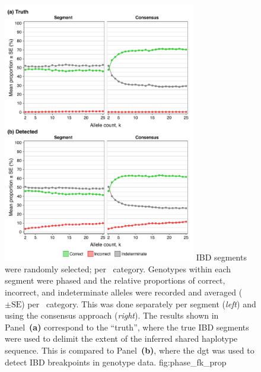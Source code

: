 

\begin{figure}[!htb]
\centering
\includegraphics[width=0.75\textwidth]{./img/ch3/phase_fk_prop}
{IBD segments were randomly selected;  per \fk{}~category.
Genotypes within each segment were phased and the relative proportions of correct, incorrect, and indeterminate alleles were recorded and averaged ($\pm\text{SE}$) per \fk{}~category.
This was done separately per segment (\emph{left}) and using the consensus approach (\emph{right}).
The results shown in Panel~\textbf{(a)} correspond to the ``truth'', where the true IBD segments were used to delimit the extent of the inferred shared haplotype sequence.
This is compared to Panel~\textbf{(b)}, where the \gls{dgt} was used to detect IBD breakpoints in genotype data.}
{fig:phase_fk_prop}
\end{figure}
